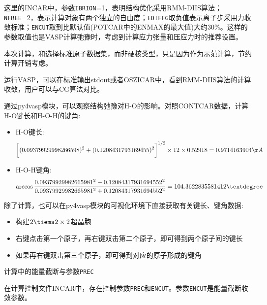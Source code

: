 这里的\textrm{INCAR}中，参数\texttt{IBRION}=1，表明结构优化采用\textrm{RMM-DIIS}算法；\texttt{NFREE}=2，表示计算对象有两个独立的自由度；\texttt{EDIFFG}取负值表示离子步采用力收敛标准；\texttt{ENCUT}取到比默认值(\textrm{POTCAR}中的\textrm{ENMAX}的最大值)大约30\%。这样的参数取值也是\textrm{VASP}计算弛豫时，考虑到计算应力张量和压应力时的推荐设置。

本次计算，和选择标准原子数据集，而非硬核类型，只是因为作为示范计算，节约计算开销考虑。

运行\textrm{VASP}，可以在标准输出\textrm{stdout}或者\textrm{OSZICAR}中，看到\textrm{RMM-DIIS}算法的计算收敛，用户可以与\textrm{CG}算法对比。

通过\textrm{py4vasp}模块，可以观察结构弛豫对\textrm{H-O}的影响。对照\textrm{CONTCAR}数据，计算\textrm{H-O}键长和\textrm{H-O-H}的键角:
\begin{itemize}
	\item \textrm{H-O}键长:
		\begin{displaymath}
			\bigg[(0.09379929998266598)^2+(0.1208431793169455)^2\bigg]^{1/2}\times12\times0.52918\\
			=0.9714163904\AA
		\end{displaymath}
	\item \textrm{H-O-H}键角:
		\begin{displaymath}
			\arccos\dfrac{0.09379929982665981^2-0.12084317931694552^2}{0.09379929982665981^2+0.12084317931694552^2}\\
			=104.3622835581412\textdegree
		\end{displaymath}
\end{itemize}
除了计算，也可以在\textrm{py4vasp}模块的可视化环境下直接获取有关键长、键角数据:
\begin{itemize}
	\item 构建$2\tiems2\times2$超晶胞
	\item 右键点击第一个原子，再右键双击第二个原子，即可得到两个原子间的键长
	\item 如果再右键双击第三个原子，即可得到对应的原子形成的键角
\end{itemize}

计算中的能量截断与参数\texttt{PREC}

在计算控制文件\textrm{INCAR}中，存在控制参数\texttt{PREC}和\texttt{ENCUT}。参数\texttt{ENCUT}是能量截断收敛参数。

